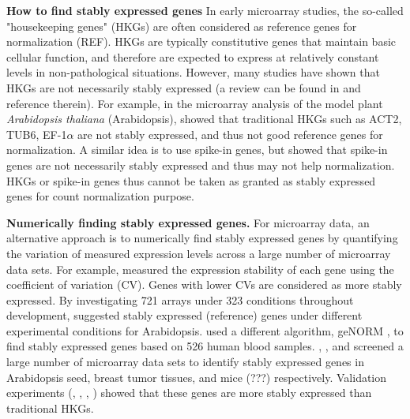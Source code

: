 \documentclass[11pt, a4paper]{article}
\begin{document}
\textbf{How to find stably expressed genes}
In early microarray studies, the so-called "housekeeping genes" (HKGs) are
often considered as reference genes for normalization (REF). HKGs are
typically constitutive genes that maintain basic cellular function, and
therefore are expected to express at relatively constant levels in
non-pathological situations.  However, many studies have shown that HKGs are
not necessarily stably expressed (a review can be found in
\cite{huggett2005real} and reference therein).  For example, in the microarray
analysis of the model plant \textit{Arabidopsis thaliana} (Arabidopsis),
\cite{czechowski2005genome} showed that traditional HKGs such as ACT2, TUB6,
EF-1$\alpha$ are not stably expressed, and thus not good reference genes for
normalization.  A similar idea is to use spike-in genes, but
\cite{risso2014nat} showed that spike-in genes are not necessarily stably
expressed and thus may not help normalization.  HKGs or spike-in genes thus
cannot be taken as granted as stably expressed genes for count normalization
purpose.
 

\textbf{Numerically finding stably expressed genes.}
For microarray data, an alternative approach is to numerically find stably
expressed genes by quantifying the variation of measured expression levels
across a large number of microarray data sets. 
For example,  \cite{czechowski2005genome}
measured the expression stability of each gene using the coefficient of
variation (CV). Genes with lower CVs are considered as more stably expressed.
By investigating 721 arrays under 323 conditions throughout development,
\cite{czechowski2005genome} suggested stably expressed (reference) genes under
different experimental conditions for Arabidopsis.
\cite{stamova2009identification} used a different algorithm, geNORM
\citep{vandesompele2002accurate}, to find stably expressed genes based on 526
human blood samples. 
 \citet{dekkers2012identification}, \citet{gur2009identification}, and
 \citet{frericks2008toolbox} screened a large number of microarray data sets
 to identify stably expressed genes in Arabidopsis seed, breast tumor tissues,
 and mice (???) respectively.
Validation experiments (\cite{czechowski2005genome},
\cite{dekkers2012identification}, \cite{huggett2005real},
\cite{stamova2009identification}) showed that these genes are more stably
expressed than traditional HKGs.  
\end{document}
